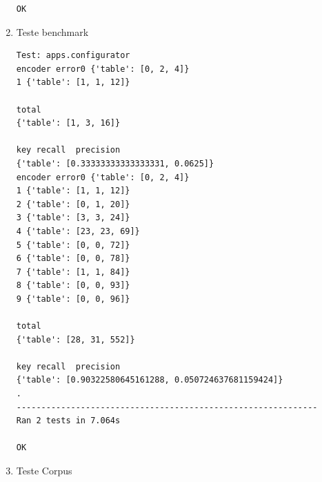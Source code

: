 \documentclass[12pt, a4paper]{article}
\begin{document}
\begin{enumerate}
\begin{verbatim}
OK
\end{verbatim}

\item Teste benchmark

\begin{verbatim}
Test: apps.configurator
encoder error0 {'table': [0, 2, 4]}
1 {'table': [1, 1, 12]}

total
{'table': [1, 3, 16]}

key recall  precision
{'table': [0.33333333333333331, 0.0625]}
encoder error0 {'table': [0, 2, 4]}
1 {'table': [1, 1, 12]}
2 {'table': [0, 1, 20]}
3 {'table': [3, 3, 24]}
4 {'table': [23, 23, 69]}
5 {'table': [0, 0, 72]}
6 {'table': [0, 0, 78]}
7 {'table': [1, 1, 84]}
8 {'table': [0, 0, 93]}
9 {'table': [0, 0, 96]}

total
{'table': [28, 31, 552]}

key recall  precision
{'table': [0.90322580645161288, 0.050724637681159424]}
.
-------------------------------------------------------------
Ran 2 tests in 7.064s

OK
\end{verbatim}

\item Teste Corpus


\end{enumerate}
\end{document}
